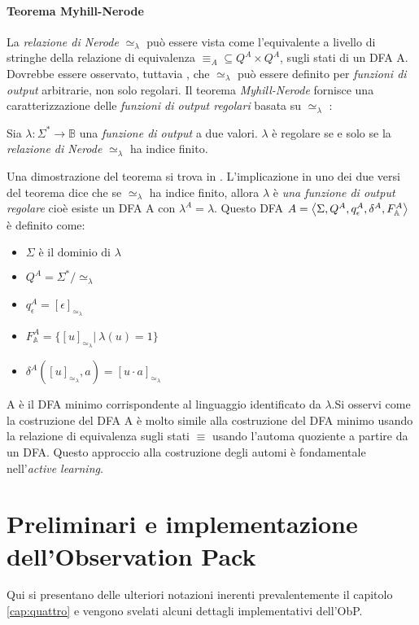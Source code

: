 \subsubsection{Teorema Myhill-Nerode}
La \textit{relazione di Nerode} $\simeq_\lambda$ può essere vista come l'equivalente a livello di stringhe della relazione di equivalenza $\equiv_A \subseteq Q^{A}\!\!\times\!Q^{A}$, sugli stati di un \ac{DFA} A. Dovrebbe essere osservato, tuttavia , che $\simeq_\lambda$ può essere definito per \textit{funzioni di output} arbitrarie, non solo regolari. Il teorema \textit{Myhill-Nerode}  fornisce una caratterizzazione delle \textit{funzioni di output regolari} basata su  $\simeq_\lambda$ :
\begin{teorema}
\label{teo:m-n}
Sia $\lambda : \Sigma^{*} \to \mathbb{B}$ una \textit{funzione di output} a due valori. $\lambda$ è regolare se e solo se la \textit{relazione di Nerode}  $\simeq_\lambda$ ha indice finito. 
\end{teorema}
Una dimostrazione del teorema si trova in \cite{Stef11}. L'implicazione in uno dei due versi del teorema dice che se $\simeq_\lambda$ ha indice finito, allora $\lambda$ è \textit{una funzione di output regolare} cioè esiste un \ac{DFA} A con $\lambda^{A} = \lambda$. Questo \ac{DFA} $A = \Braket{\Sigma,Q^{A},q_{\epsilon}^{A},\delta^{A},F_{\mathbb{A}}^{A}}$ è definito come:
\begin{itemize}
\item $\Sigma \text{ è il dominio di } \lambda$
\item $Q^{A} = \Sigma^{*}/\!\!\simeq_{\lambda}$
\item $q_{\epsilon}^{A} = [\epsilon]_{\simeq_{\lambda}}$
\item $F_{\mathbb{A}}^{A} = \{[u]_{\simeq_{\lambda}} | \: \lambda(u)=1\}$
\item $\delta^{A}([u]_{\simeq_{\lambda}} , a) = [u\!\cdot{}\!a]_{\simeq_{\lambda}}$ 
\end{itemize}
A è il \ac{DFA} minimo corrispondente al linguaggio identificato da $\lambda$.Si osservi come la costruzione del \ac{DFA} A è molto simile alla costruzione del \ac{DFA} minimo  usando la relazione di equivalenza sugli stati $\equiv$ usando l'automa quoziente a partire da un \ac{DFA}. Questo approccio alla costruzione degli automi è fondamentale nell'\textit{active learning}.

\chapter[Prel. e impl. ObP]{Preliminari e implementazione dell'Observation Pack}
\label{app:due}
Qui si presentano delle ulteriori notazioni inerenti prevalentemente il capitolo \ref{cap:quattro} e vengono svelati alcuni dettagli implementativi dell'\ac{ObP}.
